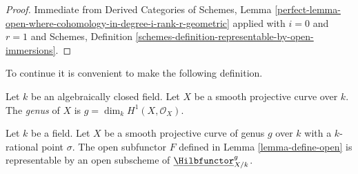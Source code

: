 \begin{proof}
Immediate from Derived Categories of Schemes, Lemma
\ref{perfect-lemma-open-where-cohomology-in-degree-i-rank-r-geometric}
applied with $i = 0$ and $r = 1$ and
Schemes, Definition \ref{schemes-definition-representable-by-open-immersions}.
\end{proof}

\noindent
To continue it is convenient to make the following definition.

\begin{definition}
\label{definition-genus}
Let $k$ be an algebraically closed field. Let $X$ be a smooth projective
curve over $k$. The {\it genus} of $X$ is $g = \dim_k H^1(X, \mathcal{O}_X)$.
\end{definition}

\begin{lemma}
\label{lemma-open-representable}
Let $k$ be a field. Let $X$ be a smooth projective curve of genus $g$
over $k$ with a $k$-rational point $\sigma$. The open subfunctor $F$ defined
in Lemma \ref{lemma-define-open} is representable by an open subscheme of
$\underline{\Hilbfunctor}^g_{X/k}$.
\end{lemma}

